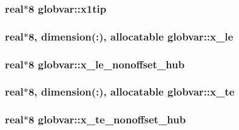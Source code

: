 \subsubsection[{x1tip}]{\setlength{\rightskip}{0pt plus 5cm}real$\ast$8 globvar\+::x1tip}\label{namespaceglobvar_ae73d73414e05c7ff4485109025aebb8b}
\hypertarget{namespaceglobvar_a97f6e6fb7adb402ab21940c4d160585c}{}
\subsubsection[{x\+\_\+le}]{\setlength{\rightskip}{0pt plus 5cm}real$\ast$8, dimension(\+:), allocatable globvar\+::x\+\_\+le}\label{namespaceglobvar_a97f6e6fb7adb402ab21940c4d160585c}
\hypertarget{namespaceglobvar_a56eebc89ec38db33a07e5123a3ebee11}{}
\subsubsection[{x\+\_\+le\+\_\+nonoffset\+\_\+hub}]{\setlength{\rightskip}{0pt plus 5cm}real$\ast$8 globvar\+::x\+\_\+le\+\_\+nonoffset\+\_\+hub}\label{namespaceglobvar_a56eebc89ec38db33a07e5123a3ebee11}
\hypertarget{namespaceglobvar_a68ad26d59e4d62a30908beaf98bdb89d}{}
\subsubsection[{x\+\_\+te}]{\setlength{\rightskip}{0pt plus 5cm}real$\ast$8, dimension(\+:), allocatable globvar\+::x\+\_\+te}\label{namespaceglobvar_a68ad26d59e4d62a30908beaf98bdb89d}
\hypertarget{namespaceglobvar_abbf81b644dde8fac9df2a6f46bfb1709}{}
\subsubsection[{x\+\_\+te\+\_\+nonoffset\+\_\+hub}]{\setlength{\rightskip}{0pt plus 5cm}real$\ast$8 globvar\+::x\+\_\+te\+\_\+nonoffset\+\_\+hub}\label{namespaceglobvar_abbf81b644dde8fac9df2a6f46bfb1709}
\hypertarget{namespaceglobvar_a8fc7e5c4a3ef5051faf2730bf96a2dd1}{}
